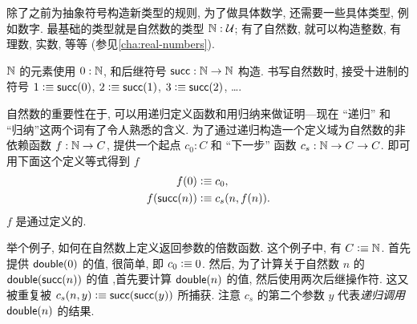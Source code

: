 %
%
%
除了之前为抽象符号构造新类型的规则, 为了做具体数学, 还需要一些具体类型, 例如数字.
最基础的类型就是自然数的类型 $\mathbb{N} : \mathcal{U}$;
有了自然数, 就可以构造整数, 有理数, 实数, 等等 (参见\cref{cha:real-numbers}).

$\mathbb{N}$ 的元素使用 $0 : \mathbb{N}$, 和后继符号 $\mathsf{succ} : \mathbb{N} \to \mathbb{N}$ 构造.
书写自然数时, 接受十进制的符号 $1 \vcentcolon\equiv \mathsf{succ}(0)$, $2 \vcentcolon\equiv \mathsf{succ}(1)$, $3 \vcentcolon\equiv \mathsf{succ}(2)$, \dots.

自然数的重要性在于, 可以用递归定义函数和用归纳来做证明---现在 ``递归'' 和 ``归纳''这两个词有了令人熟悉的含义.
%
为了通过递归构造一个定义域为自然数的非依赖函数 $f : \mathbb{N} \to C$, 提供一个起点 $c_0 : C$ 和 ``下一步'' 函数 $c_s : \mathbb{N} \to C \to C$.
即可用下面这个定义等式得到 $f$
%
\begin{align*}
    f(0) &\vcentcolon\equiv c_0, \\
    f(\mathsf{succ}(n)) &\vcentcolon\equiv c_s(n,f(n)).
\end{align*}
$f$ 是通过定义的.
%
%

举个例子, 如何在自然数上定义返回参数的倍数函数.
这个例子中, 有 $C\vcentcolon\equiv \mathbb{N}$.
首先提供 $\mathsf{double}(0)$ 的值, 很简单, 即 $c_0 \vcentcolon\equiv 0$.
然后, 为了计算关于自然数 $n$ 的 $\mathsf{double}(\mathsf{succ}(n))$ 的值 ,首先要计算 $\mathsf{double}(n)$ 的值, 然后使用两次后继操作符.
这又被重复被 $c_s(n,y) \vcentcolon\equiv \mathsf{succ}(\mathsf{succ}(y))$ 所捕获.
注意 $c_s$ 的第二个参数 $y$ 代表\emph{递归调用} $\mathsf{double}(n)$ 的结果.

